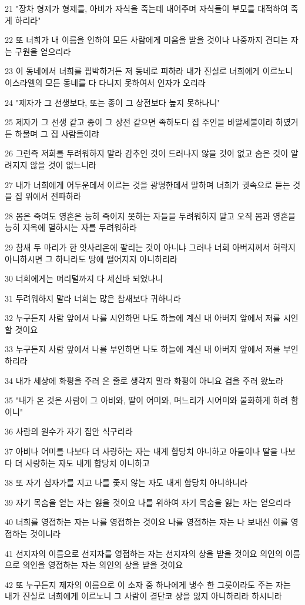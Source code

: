\par 21 "장차 형제가 형제를, 아비가 자식을 죽는데 내어주며 자식들이 부모를 대적하여 죽게 하리라"
\par 22 또 너희가 내 이름을 인하여 모든 사람에게 미움을 받을 것이나 나중까지 견디는 자는 구원을 얻으리라
\par 23 이 동네에서 너희를 핍박하거든 저 동네로 피하라 내가 진실로 너희에게 이르노니 이스라엘의 모든 동네를 다 다니지 못하여서 인자가 오리라
\par 24 "제자가 그 선생보다, 또는 종이 그 상전보다 높지 못하나니"
\par 25 제자가 그 선생 같고 종이 그 상전 같으면 족하도다 집 주인을 바알세불이라 하였거든 하물며 그 집 사람들이랴
\par 26 그런즉 저희를 두려워하지 말라 감추인 것이 드러나지 않을 것이 없고 숨은 것이 알려지지 않을 것이 없느니라
\par 27 내가 너희에게 어두운데서 이르는 것을 광명한데서 말하며 너희가 귓속으로 듣는 것을 집 위에서 전파하라
\par 28 몸은 죽여도 영혼은 능히 죽이지 못하는 자들을 두려워하지 말고 오직 몸과 영혼을 능히 지옥에 멸하시는 자를 두려워하라
\par 29 참새 두 마리가 한 앗사리온에 팔리는 것이 아니냐 그러나 너희 아버지께서 허락지 아니하시면 그 하나라도 땅에 떨어지지 아니하리라
\par 30 너희에게는 머리털까지 다 세신바 되었나니
\par 31 두려워하지 말라 너희는 많은 참새보다 귀하니라
\par 32 누구든지 사람 앞에서 나를 시인하면 나도 하늘에 계신 내 아버지 앞에서 저를 시인할 것이요
\par 33 누구든지 사람 앞에서 나를 부인하면 나도 하늘에 계신 내 아버지 앞에서 저를 부인하리라
\par 34 내가 세상에 화평을 주러 온 줄로 생각지 말라 화평이 아니요 검을 주러 왔노라
\par 35 "내가 온 것은 사람이 그 아비와, 딸이 어미와, 며느리가 시어미와 불화하게 하려 함이니"
\par 36 사람의 원수가 자기 집안 식구리라
\par 37 아비나 어미를 나보다 더 사랑하는 자는 내게 합당치 아니하고 아들이나 딸을 나보다 더 사랑하는 자도 내게 합당치 아니하고
\par 38 또 자기 십자가를 지고 나를 좇지 않는 자도 내게 합당치 아니하니라
\par 39 자기 목숨을 얻는 자는 잃을 것이요 나를 위하여 자기 목숨을 잃는 자는 얻으리라
\par 40 너희를 영접하는 자는 나를 영접하는 것이요 나를 영접하는 자는 나 보내신 이를 영접하는 것이니라
\par 41 선지자의 이름으로 선지자를 영접하는 자는 선지자의 상을 받을 것이요 의인의 이름으로 의인을 영접하는 자는 의인의 상을 받을 것이요
\par 42 또 누구든지 제자의 이름으로 이 소자 중 하나에게 냉수 한 그릇이라도 주는 자는 내가 진실로 너희에게 이르노니 그 사람이 결단코 상을 잃지 아니하리라 하시니라

